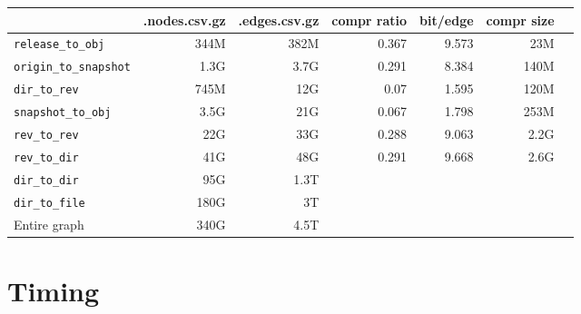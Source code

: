 \documentclass[11pt,a4paper]{article}
\begin{document}
\begin{center}
    \begin{tabular}{@{} l *6r @{}}
        \toprule
        \multicolumn{1}{c}{} &
            \textbf{.nodes.csv.gz} & \textbf{.edges.csv.gz} &
            \textbf{compr ratio} & \textbf{bit/edge} & \textbf{compr size} \\
        \midrule
        \texttt{release\_to\_obj} & 344M & 382M & 0.367 & 9.573 & 23M \\
        \texttt{origin\_to\_snapshot} & 1.3G & 3.7G & 0.291 & 8.384 & 140M \\
        \texttt{dir\_to\_rev} & 745M & 12G & 0.07 & 1.595 & 120M & \\
        \texttt{snapshot\_to\_obj} & 3.5G & 21G & 0.067 & 1.798 & 253M \\
        \texttt{rev\_to\_rev} & 22G & 33G & 0.288 & 9.063 & 2.2G \\
        \texttt{rev\_to\_dir} & 41G & 48G & 0.291 & 9.668 & 2.6G \\
        \texttt{dir\_to\_dir} & 95G & 1.3T & & & \\
        \texttt{dir\_to\_file} & 180G & 3T & & & \\
        \midrule
        Entire graph & ~340G & ~4.5T & \\
        \bottomrule
    \end{tabular}
\end{center}

\section{Timing}
\end{document}
